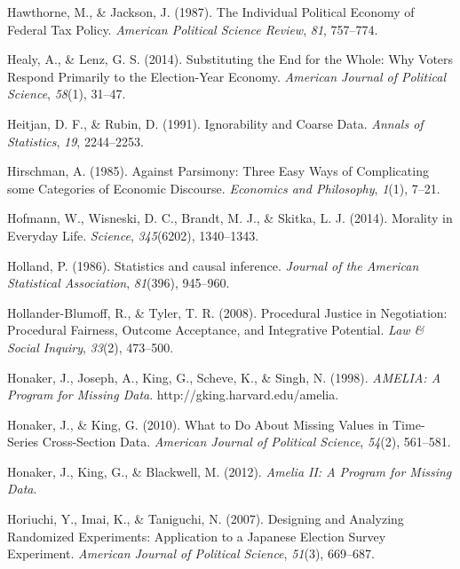 \documentclass[12pt,econ]{sources/authesis}
\begin{document}
\leavevmode\hypertarget{ref-hawthorne_individual_1987}{}%
Hawthorne, M., \& Jackson, J. (1987). The Individual Political Economy of Federal Tax Policy. \emph{American Political Science Review}, \emph{81}, 757--774.

\leavevmode\hypertarget{ref-healy_2014_substituting}{}%
Healy, A., \& Lenz, G. S. (2014). Substituting the End for the Whole: Why Voters Respond Primarily to the Election-Year Economy. \emph{American Journal of Political Science}, \emph{58}(1), 31--47.

\leavevmode\hypertarget{ref-heitjan_1991_ignorability}{}%
Heitjan, D. F., \& Rubin, D. (1991). Ignorability and Coarse Data. \emph{Annals of Statistics}, \emph{19}, 2244--2253.

\leavevmode\hypertarget{ref-hirschman_against_1985}{}%
Hirschman, A. (1985). Against Parsimony: Three Easy Ways of Complicating some Categories of Economic Discourse. \emph{Economics and Philosophy}, \emph{1}(1), 7--21.

\leavevmode\hypertarget{ref-hofmann_2014_morality}{}%
Hofmann, W., Wisneski, D. C., Brandt, M. J., \& Skitka, L. J. (2014). Morality in Everyday Life. \emph{Science}, \emph{345}(6202), 1340--1343.

\leavevmode\hypertarget{ref-holland_1986_statistics}{}%
Holland, P. (1986). Statistics and causal inference. \emph{Journal of the American Statistical Association}, \emph{81}(396), 945--960.

\leavevmode\hypertarget{ref-hollander-blumoff_2008_procedural}{}%
Hollander-Blumoff, R., \& Tyler, T. R. (2008). Procedural Justice in Negotiation: Procedural Fairness, Outcome Acceptance, and Integrative Potential. \emph{Law \& Social Inquiry}, \emph{33}(2), 473--500.

\leavevmode\hypertarget{ref-honaker_1998_amelia}{}%
Honaker, J., Joseph, A., King, G., Scheve, K., \& Singh, N. (1998). \emph{AMELIA: A Program for Missing Data}. http://gking.harvard.edu/amelia.

\leavevmode\hypertarget{ref-honaker_2010_what}{}%
Honaker, J., \& King, G. (2010). What to Do About Missing Values in Time-Series Cross-Section Data. \emph{American Journal of Political Science}, \emph{54}(2), 561--581.

\leavevmode\hypertarget{ref-honaker_2012_amelia}{}%
Honaker, J., King, G., \& Blackwell, M. (2012). \emph{Amelia II: A Program for Missing Data}.

\leavevmode\hypertarget{ref-horiuchi_2007_designing}{}%
Horiuchi, Y., Imai, K., \& Taniguchi, N. (2007). Designing and Analyzing Randomized Experiments: Application to a Japanese Election Survey Experiment. \emph{American Journal of Political Science}, \emph{51}(3), 669--687.
\end{document}
